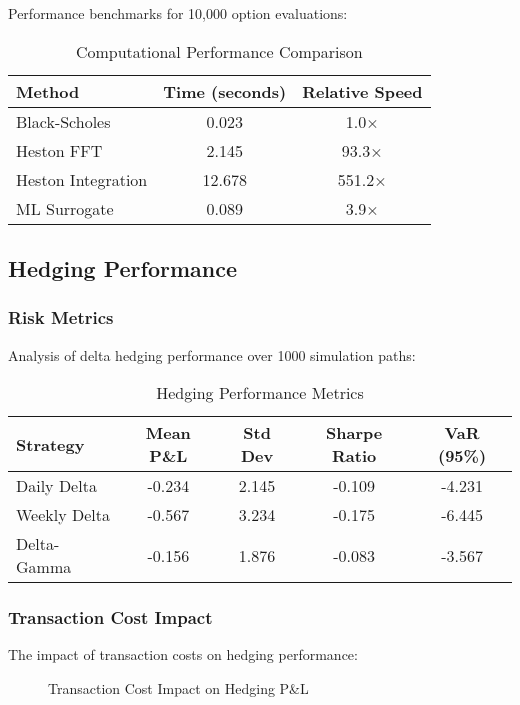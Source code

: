 \documentclass[12pt,a4paper]{article}
\begin{document}
Performance benchmarks for 10,000 option evaluations:

\begin{table}[H]
\centering
\caption{Computational Performance Comparison}
\begin{tabular}{@{}lcc@{}}
\toprule
Method & Time (seconds) & Relative Speed \\
\midrule
Black-Scholes & 0.023 & 1.0× \\
Heston FFT & 2.145 & 93.3× \\
Heston Integration & 12.678 & 551.2× \\
ML Surrogate & 0.089 & 3.9× \\
\bottomrule
\end{tabular}
\end{table}

\subsection{Hedging Performance}

\subsubsection{Risk Metrics}

Analysis of delta hedging performance over 1000 simulation paths:

\begin{table}[H]
\centering
\caption{Hedging Performance Metrics}
\begin{tabular}{@{}lcccc@{}}
\toprule
Strategy & Mean P\&L & Std Dev & Sharpe Ratio & VaR (95\%) \\
\midrule
Daily Delta & -0.234 & 2.145 & -0.109 & -4.231 \\
Weekly Delta & -0.567 & 3.234 & -0.175 & -6.445 \\
Delta-Gamma & -0.156 & 1.876 & -0.083 & -3.567 \\
\bottomrule
\end{tabular}
\end{table}

\subsubsection{Transaction Cost Impact}

The impact of transaction costs on hedging performance:

\begin{figure}[H]
\centering
\caption{Transaction Cost Impact on Hedging P\&L}
\label{fig:transaction_costs}
\end{figure}
\end{document}
